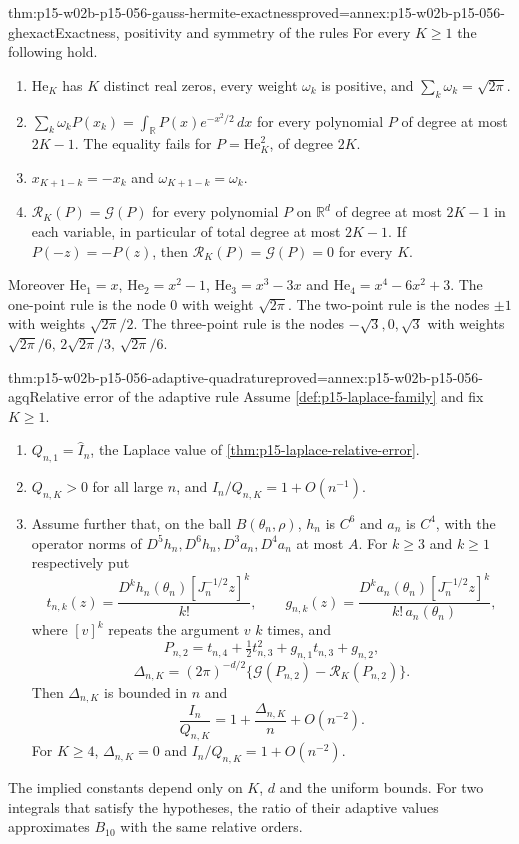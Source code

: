\begin{hblemma}{thm:p15-w02b-p15-056-gauss-hermite-exactness}{proved=annex:p15-w02b-p15-056-ghexact}{Exactness, positivity and symmetry of the rules}
For every \(K\geq1\) the following hold.
\begin{enumerate}
\item \(\mathrm{He}_K\) has \(K\) distinct real zeros, every weight
\(\omega_k\) is positive, and \(\sum_k\omega_k=\sqrt{2\pi}\).
\item \(\sum_k\omega_kP(x_k)=\int_{\mathbb R}P(x)e^{-x^2/2}\,dx\) for every
polynomial \(P\) of degree at most \(2K-1\). The equality fails for
\(P=\mathrm{He}_K^2\), of degree \(2K\).
\item \(x_{K+1-k}=-x_k\) and \(\omega_{K+1-k}=\omega_k\).
\item \(\mathcal R_K(P)=\mathcal G(P)\) for every polynomial \(P\) on
\(\mathbb R^d\) of degree at most \(2K-1\) in each variable, in
particular of total degree at most \(2K-1\). If \(P(-z)=-P(z)\), then
\(\mathcal R_K(P)=\mathcal G(P)=0\) for every \(K\).
\end{enumerate}
Moreover \(\mathrm{He}_1=x\), \(\mathrm{He}_2=x^2-1\),
\(\mathrm{He}_3=x^3-3x\) and \(\mathrm{He}_4=x^4-6x^2+3\). The one-point
rule is the node \(0\) with weight \(\sqrt{2\pi}\). The two-point rule is
the nodes \(\pm1\) with weights \(\sqrt{2\pi}/2\). The three-point rule is
the nodes \(-\sqrt3,0,\sqrt3\) with weights
\(\sqrt{2\pi}/6,\,2\sqrt{2\pi}/3,\,\sqrt{2\pi}/6\).
\end{hblemma}

\begin{hbtheorem}{thm:p15-w02b-p15-056-adaptive-quadrature}{proved=annex:p15-w02b-p15-056-agq}{Relative error of the adaptive rule}
Assume \cref{def:p15-laplace-family} and fix \(K\geq1\).
\begin{enumerate}
\item \(Q_{n,1}=\widehat I_n\), the Laplace value of
\cref{thm:p15-laplace-relative-error}.
\item \(Q_{n,K}>0\) for all large \(n\), and
\(I_n/Q_{n,K}=1+O(n^{-1})\).
\item Assume further that, on the ball \(B(\theta_n,\rho)\), \(h_n\) is
\(C^6\) and \(a_n\) is \(C^4\), with the operator norms of
\(D^5h_n,D^6h_n,D^3a_n,D^4a_n\) at most \(A\). For \(k\geq3\) and
\(k\geq1\) respectively put
\[
 t_{n,k}(z)=\frac{D^kh_n(\theta_n)[J_n^{-1/2}z]^k}{k!},\qquad
 g_{n,k}(z)=\frac{D^ka_n(\theta_n)[J_n^{-1/2}z]^k}{k!\,a_n(\theta_n)},
\]
where \([v]^k\) repeats the argument \(v\) \(k\) times, and
\[
 P_{n,2}=t_{n,4}+\tfrac12t_{n,3}^2+g_{n,1}t_{n,3}+g_{n,2},
\]
\[
 \Delta_{n,K}=(2\pi)^{-d/2}\{\mathcal G(P_{n,2})-\mathcal R_K(P_{n,2})\}.
\]
Then \(\Delta_{n,K}\) is bounded in \(n\) and
\[
 \frac{I_n}{Q_{n,K}}=1+\frac{\Delta_{n,K}}n+O(n^{-2}).
\]
For \(K\geq4\), \(\Delta_{n,K}=0\) and \(I_n/Q_{n,K}=1+O(n^{-2})\).
\end{enumerate}
The implied constants depend only on \(K\), \(d\) and the uniform bounds.
For two integrals that satisfy the hypotheses, the ratio of their adaptive
values approximates \(B_{10}\) with the same relative orders.
\end{hbtheorem}

